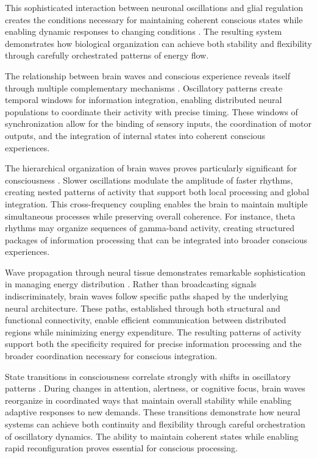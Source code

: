 \begin{refsection}
This sophisticated interaction between neuronal oscillations and glial regulation creates the conditions necessary for maintaining coherent conscious states while enabling dynamic responses to changing conditions \cite{Basar2013}. The resulting system demonstrates how biological organization can achieve both stability and flexibility through carefully orchestrated patterns of energy flow.

The relationship between brain waves and conscious experience reveals itself through multiple complementary mechanisms \cite{Jensen2007}. Oscillatory patterns create temporal windows for information integration, enabling distributed neural populations to coordinate their activity with precise timing. These windows of synchronization allow for the binding of sensory inputs, the coordination of motor outputs, and the integration of internal states into coherent conscious experiences.

The hierarchical organization of brain waves proves particularly significant for consciousness \cite{Lisman2013}. Slower oscillations modulate the amplitude of faster rhythms, creating nested patterns of activity that support both local processing and global integration. This cross-frequency coupling enables the brain to maintain multiple simultaneous processes while preserving overall coherence. For instance, theta rhythms may organize sequences of gamma-band activity, creating structured packages of information processing that can be integrated into broader conscious experiences.

Wave propagation through neural tissue demonstrates remarkable sophistication in managing energy distribution \cite{Palva2012}. Rather than broadcasting signals indiscriminately, brain waves follow specific paths shaped by the underlying neural architecture. These paths, established through both structural and functional connectivity, enable efficient communication between distributed regions while minimizing energy expenditure. The resulting patterns of activity support both the specificity required for precise information processing and the broader coordination necessary for conscious integration.

State transitions in consciousness correlate strongly with shifts in oscillatory patterns \cite{Singer2018}. During changes in attention, alertness, or cognitive focus, brain waves reorganize in coordinated ways that maintain overall stability while enabling adaptive responses to new demands. These transitions demonstrate how neural systems can achieve both continuity and flexibility through careful orchestration of oscillatory dynamics. The ability to maintain coherent states while enabling rapid reconfiguration proves essential for conscious processing.


\end{refsection}
